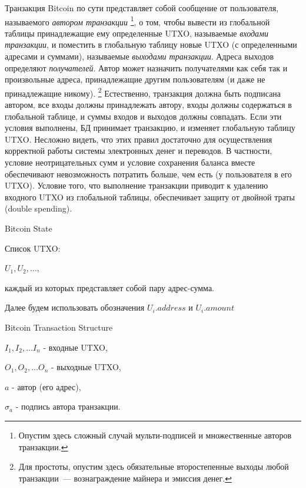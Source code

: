 \documentclass{article}
\begin{document}
Транзакция Bitcoin по сути представляет собой сообщение от пользователя,
называемого \textit{автором транзакции}
\footnote{Опустим здесь сложный случай мульти-подписей и множественные авторов транзакции.},
о том, чтобы вывести из глобальной таблицы принадлежащие ему определенные UTXO,
называемые \textit{входами транзакции},
и поместить в глобальную таблицу новые UTXO (с определенными адресами и суммами),
называемые \textit{выходами транзакции}.
Адреса выходов определяют \textit{получателей}. Автор может назначить получателями
как себя так и произвольные адреса, принадлежащие другим пользователям (и
даже не принадлежащие никому).
\footnote{Для простоты, опустим здесь обязательные второстепенные выходы любой транзакции~---
вознаграждение майнера и эмиссия денег.}
Естественно, транзакция должна быть подписана автором,
все входы должны принадлежать автору, входы должны содержаться в глобальной таблице,
 и суммы входов и выходов должны совпадать.
Если эти условия выполнены, БД принимает транзакцию, и изменяет глобальную таблицу UTXO.
Несложно видеть, что этих правил достаточно для осуществления корректной работы
системы электронных денег и переводов. В частности, условие неотрицательных сумм и
условие сохранения баланса вместе обеспечивают невозможность потратить больше,
чем есть (у пользователя в его UTXO).
Условие того, что выполнение транзакции приводит к удалению входного UTXO
из глобальной таблицы, обеспечивает защиту от двойной траты (double spending).


\begin{algorithm}
\begin{algorithmic}
\caption{Bitcoin State}
\item Список UTXO:
\item $U_1, U_2, \ldots$,
\item каждый из которых представляет собой пару адрес-сумма.
\item Далее будем использовать обозначения $U_i.address$ и $U_i.amount$

\end{algorithmic}
\end{algorithm}

\begin{algorithm}
\begin{algorithmic}
\caption{Bitcoin Transaction Structure}
\item $I_1, I_2, \ldots I_n$ - входные UTXO,
\item $O_1, O_2, \ldots O_n$ - выходные UTXO,
\item $a$ - автор (его адрес),
\item $\sigma_a$ - подпись автора транзакции.
\end{algorithmic}
\end{algorithm}
\end{document}
